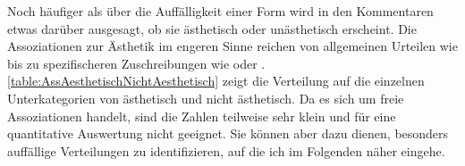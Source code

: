 Noch häufiger als über die Auffälligkeit einer Form wird in den Kommentaren etwas darüber ausgesagt, ob sie ästhetisch oder unästhetisch erscheint. 
Die Assoziationen zur Ästhetik im engeren Sinne reichen von allgemeinen Urteilen wie  bis zu spezifischeren Zuschreibungen wie  oder . 
\autoref{table:AssAesthetischNichtAesthetisch} zeigt die Verteilung auf die einzelnen Unterkategorien von \glqq ästhetisch\grqq{} und \glqq nicht ästhetisch\grqq.
Da es sich um freie Assoziationen handelt, sind die Zahlen teilweise sehr klein und für eine quantitative Auswertung nicht geeignet. 
Sie können aber dazu dienen, besonders auffällige Verteilungen zu identifizieren, auf die ich im Folgenden näher eingehe. 
